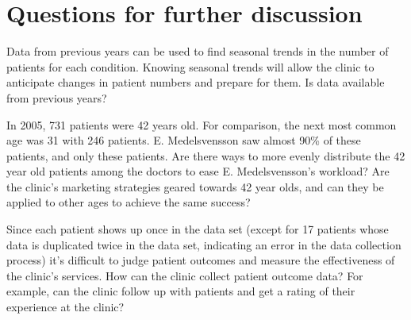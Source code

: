 \section{Questions for further discussion}
Data from previous years can be used to find seasonal trends in the number of patients for each condition. Knowing seasonal trends will allow the clinic to anticipate changes in patient numbers and prepare for them. Is data available from previous years?

In 2005, 731 patients were 42 years old. For comparison, the next most common age was 31 with 246 patients. E. Medelsvensson saw almost 90\% of these patients, and only these patients. Are there ways to more evenly distribute the 42 year old patients among the doctors to ease E. Medelsvensson's workload? Are the clinic's marketing strategies geared towards 42 year olds, and can they be applied to other ages to achieve the same success?

Since each patient shows up once in the data set (except for 17 patients whose data is duplicated twice in the data set, indicating an error in the data collection process) it's difficult to judge patient outcomes and measure the effectiveness of the clinic's services. How can the clinic collect patient outcome data? For example, can the clinic follow up with patients and get a rating of their experience at the clinic?
